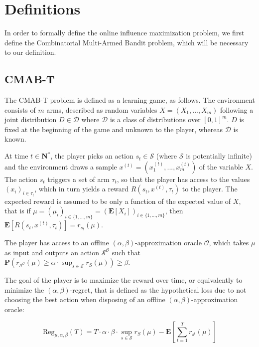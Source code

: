 \documentclass[a4paper,12pt]{article}
\begin{document}
\section{Definitions}
\label{scn:def}

In order to formally define the online influence maximization problem, we first define the Combinatorial Multi-Armed Bandit problem, which will be necessary to our definition.

\subsection{CMAB-T}

The CMAB-T problem is defined as a learning game, as follows. The environment consists of $m$ arms, described as random variables $X = (X_1, ..., X_m)$ following a joint distribution $D\in \mathcal{D}$ where $\mathcal{D}$ is a class of distributions over $[0, 1]^m$.  $D$ is fixed at the beginning of the game and unknown to the player, whereas $\mathcal{D}$ is known.

At time $t\in\mathbf{N}^*$, the player picks an action $s_t\in\mathcal{S}$ (where $\mathcal{S}$ is potentially infinite) and the environment draws a sample $x^{(t)} = (x^{(t)}_1, ..., x^{(t)}_m)$ of the variable $X$. The action $s_t$ triggers a set of arm $\tau_t$, so that the player has access to the values $(x_i)_{i\in\tau_t}$, which in turn yields a reward $R(s_t, x^{(t)}, \tau_t)$ to the player. The expected reward is assumed to be only a function of the expected value of $X$, that is if $\mu = (\mu_i)_{i\in\{1, ..., m\}} = (\mathbf{E}[X_i])_{i\in\{1, ..., m\}}$, then $\mathbf{E}[R(s_t, x^{(t)}, \tau_t)] = r_{s_t}(\mu)$.

The player has access to an offline $(\alpha, \beta)$-approximation oracle $\mathcal{O}$, which takes $\mu$ as input and outputs an action $\mathcal{S}^{\mathcal{O}}$ such that $\mathbf{P}(r_{\mathcal{S}^{\mathcal{O}}}(\mathcal{\mu}) \geq \alpha\cdot\sup_{s\in\mathcal{S}}r_S(\mu)) \geq \beta$.

The goal of the player is to maximize the reward over time, or equivalently to minimize the $(\alpha, \beta)$-regret, that is defined as the hypothetical loss due to not choosing the best action when disposing of an offline $(\alpha, \beta)$-approximation oracle: 

\begin{equation}
 \label{eqn:regret}
\text{Reg}_{\mu, \alpha, \beta}(T) = T\cdot\alpha\cdot\beta\cdot\sup_{s\in\mathcal{S}}r_S(\mu) - \mathbf{E}\left[\sum_{t = 1}^{T}r_{s^{t}}(\mu)\right]
\end{equation}
\end{document}
